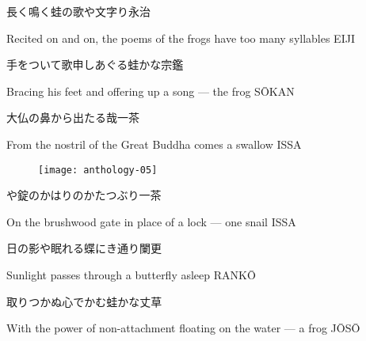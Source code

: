 \begin{haiku}
    {\FH 長く鳴く蛙の歌や文字り}\hfill{\FH 永治}

    \vin{} Recited on and on,
    \vin{} \vin{} the poems of the frogs
    \vin{} \vin{} \vin{} have too many syllables \hspace{\fill} EIJI
\end{haiku}

\begin{haiku}
    {\FH 手をついて歌申しあぐる蛙かな}\hfill{\FH 宗鑑}

    \vin{} Bracing his feet
    \vin{} \vin{} and offering up a song ---
    \vin{} \vin{} \vin{} the frog \hspace{\fill} S\={O}KAN
\end{haiku}

\begin{haiku}
    {\FH 大仏の鼻から出たる哉}\hfill{\FH 一茶}

    \vin{} From the nostril
    \vin{} \vin{} of the Great Buddha comes
    \vin{} \vin{} \vin{} a swallow \hspace{\fill} ISSA
\end{haiku}

\begin{figure}
    \texttt{[image: anthology-05]}
\end{figure}

\begin{haiku}
    {\FH {}や錠のかはりのかたつぶり}\hfill{\FH 一茶}

    \vin{} On the brushwood gate
    \vin{} \vin{} in place of a lock ---
    \vin{} \vin{} \vin{} one snail \hspace{\fill} ISSA
\end{haiku}

\begin{haiku}
    {\FH 日の影や眠れる蝶にき通り}\hfill{\FH 闌更}

    \vin{} Sunlight
    \vin{} \vin{} passes through a butterfly
    \vin{} \vin{} \vin{} asleep \hspace{\fill} RANK\={O}
\end{haiku}

\begin{haiku}
    {\FH 取りつかぬ心でかむ蛙かな}\hfill{\FH 丈草}

    \vin{} With the power of non-attachment
    \vin{} \vin{} floating on the water ---
    \vin{} \vin{} \vin{} a frog \hspace{\fill} J\={O}S\={O}
\end{haiku}

